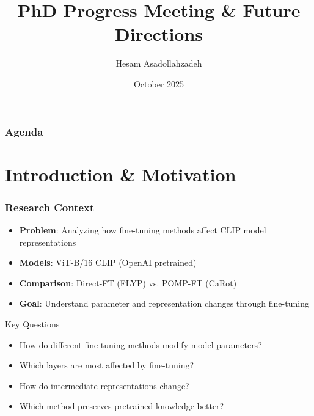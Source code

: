 \documentclass[aspectratio=1610, fontsize=8pt]{beamer}
\title{PhD Progress Meeting \& Future Directions}
\author{Hesam Asadollahzadeh}
\institute{The University of Melbourne}
\date{October 2025}
\begin{document}
\begin{frame}
    \maketitle
\end{frame}

\begin{frame}
    \frametitle{Agenda}
    \tableofcontents
\end{frame}

\section{Introduction \& Motivation}

\begin{frame}
    \frametitle{Research Context}
    \begin{itemize}
        \item \textbf{Problem}: Analyzing how fine-tuning methods affect CLIP model representations
        \item \textbf{Models}: ViT-B/16 CLIP (OpenAI pretrained)
        \item \textbf{Comparison}: Direct-FT (FLYP) vs. POMP-FT (CaRot)
        \item \textbf{Goal}: Understand parameter and representation changes through fine-tuning
    \end{itemize}
    
    \vspace{0.5cm}
    \begin{block}{Key Questions}
        \begin{itemize}
            \item How do different fine-tuning methods modify model parameters?
            \item Which layers are most affected by fine-tuning?
            \item How do intermediate representations change?
            \item Which method preserves pretrained knowledge better?
        \end{itemize}
    \end{block}
\end{frame}
\end{document}

